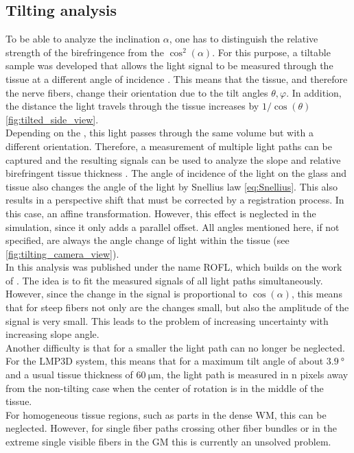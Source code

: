 \subsection{Tilting analysis}
% 
To be able to analyze the inclination $\alpha$, one has to distinguish the relative strength of the birefringence from the $\cos^2(\alpha)$.
For this purpose, a tiltable sample was developed that allows the light signal to be measured through the tissue at a different angle of incidence \cite{Axer2011}.
This means that the tissue, and therefore the nerve fibers, change their orientation due to the tilt angles $\theta, \varphi$.
In addition, the distance the light travels through the tissue increases by $1/\cos(\theta)$ \cref{fig:tilted_side_view}.
\\
% 
Depending on the \pixelsize{}, this light passes through the same volume but with a different orientation.
Therefore, a measurement of multiple light paths can be captured and the resulting signals can be used to analyze the slope and relative birefringent tissue thickness \trel{}.
The angle of incidence of the light on the glass and tissue also changes the angle of the light by Snellius law \cref{eq:Snellius}.
This also results in a perspective shift that must be corrected by a registration process.
In this case, an affine transformation.
However, this effect is neglected in the simulation, since it only adds a parallel offset.
All angles mentioned here, if not specified, are always the angle change of light within the tissue (see \cref{fig:tilting_camera_view}). 
\\
% 
In \cite{Schmitz2018} this analysis was published under the name \ac{ROFL}, which builds on the work of \cite{Wiese:887678}.
The idea is to fit the measured signals of all light paths simultaneously.
However, since the change in the signal is proportional to $\cos(\alpha)$, this means that for steep fibers not only are the changes small, but also the amplitude of the signal is very small.
This leads to the problem of increasing uncertainty with increasing slope angle.
\\
% 
Another difficulty is that for a smaller \pixelsize{} the light path can no longer be neglected.
For the \ac{LMP3D} system, this means that for a maximum tilt angle of about $\SI{3.9}{\degree}$ and a usual tissue thickness of $\SI{60}{\micro\meter}$, the light path is measured in n \dummy{} pixels away from the non-tilting case when the center of rotation is in the middle of the tissue.
\\
% 
For homogeneous tissue regions, such as parts in the dense \ac{WM}, this can be neglected.
However, for single fiber paths crossing other fiber bundles or in the extreme single visible fibers in the \ac{GM} this is currently an unsolved problem.
% 
% 
% 
